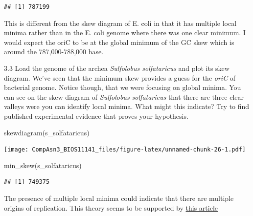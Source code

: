 \documentclass[
]{article}
\newenvironment{Shaded}{\begin{snugshade}}{\end{snugshade}}
\newcommand{\FunctionTok}[1]{\textcolor[rgb]{0.00,0.00,0.00}{#1}}
\newcommand{\NormalTok}[1]{#1}
\begin{document}
\begin{verbatim}
## [1] 787199
\end{verbatim}

{ This is different from the skew diagram of E. coli in that it has
multiple local minima rather than in the E. coli genome where there was
one clear minimum. I would expect the oriC to be at the global minimum
of the GC skew which is around the 787,000-788,000 base. }

3.3 Load the genome of the archea \emph{Sulfolobus solfataricus} and
plot its skew diagram. We've seen that the minimum skew provides a guess
for the \emph{oriC} of bacterial genome. Notice though, that we were
focusing on global minima. You can see on the skew diagram of
\emph{Sulfolobus solfataricus} that there are three clear valleys were
you can identify local minima. What might this indicate? Try to find
published experimental evidence that proves your hypothesis. \span

\begin{Shaded}
\begin{Highlighting}[]
\FunctionTok{skewdiagram}\NormalTok{(s\_solfataricus)}
\end{Highlighting}
\end{Shaded}

\texttt{[image: CompAsn3\_BIOS11141\_files/figure-latex/unnamed-chunk-26-1.pdf]}

\begin{Shaded}
\begin{Highlighting}[]
\FunctionTok{min\_skew}\NormalTok{(s\_solfataricus)}
\end{Highlighting}
\end{Shaded}

\begin{verbatim}
## [1] 749375
\end{verbatim}

{ The presence of multiple local minima could indicate that there are
multiple origins of replication. This theory seems to be supported by
\href{https://www-ncbi-nlm-nih-gov.proxy.uchicago.edu/pmc/articles/PMC7525243/}{this
article} }
\end{document}
